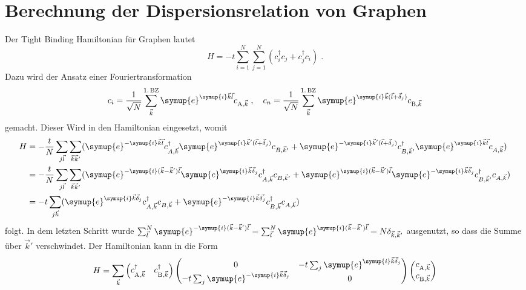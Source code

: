 \section{Berechnung der Dispersionsrelation von Graphen}
\label{sec:calc_dispersion}
Der Tight Binding Hamiltonian für Graphen lautet
\begin{equation*}
   H= - t \sum_{i=1}^N \sum_{j=1}^N\left ( c_i^\dagger c_j + c_j^\dagger c_i \right ) \; .
\end{equation*}
Dazu wird der Ansatz einer Fouriertransformation 
\begin{equation*}
    c_i = \frac{1}{\sqrt{N}} \sum_{\vec{k}}^{1. \, \text{BZ}} \symup{e}^{\symup{i}\vec{k}\vec{l}} c_{\text{A}, \vec{k}} \; , 
    \quad c_n = \frac{1}{\sqrt{N}} \sum_{\vec{k}}^{1. \, \text{BZ}} \symup{e}^{\symup{i}\vec{k}(\vec{l}+\vec{\delta}_j)} c_{\text{B}, \vec{k}}
\end{equation*}
gemacht. 
Dieser Wird in den Hamiltonian eingesetzt, womit 
\begin{align*}
    H &= -\frac{t}{N} \sum_{j\vec{l}} \sum_{\vec{k}\vec{k}'} ( \symup{e}^{-\symup{i}\vec{k}\vec{l}}c^\dagger_{A,\vec{k}} 
    \symup{e}^{\symup{i}\vec{k}'(\vec{l}+\vec{\delta}_j)}c_{B,\vec{k}'} + \symup{e}^{-\symup{i}\vec{k}'(\vec{l}+\vec{\delta}_j)} c^\dagger_{B,\vec{k}'} 
    \symup{e}^{\symup{i}\vec{k}\vec{l}}c_{A,\vec{k}}) \\
    &= -\frac{t}{N} \sum_{j\vec{l}} \sum_{\vec{k}\vec{k}'} ( \symup{e}^{-\symup{i}(\vec{k}- \vec{k}')\vec{l}}\symup{e}^{\symup{i}\vec{k}\vec{\delta}_j}c^\dagger_{A,\vec{k}} c_{B,\vec{k}'} + 
    \symup{e}^{\symup{i}(\vec{k}- \vec{k}')\vec{l}} \symup{e}^{-\symup{i}\vec{k}\vec{\delta}_j} c^\dagger_{B,\vec{k}'}c_{A,\vec{k}}) \\
    &= -t \sum_{j\vec{k}} ( \symup{e}^{\symup{i}\vec{k}\vec{\delta}_j}c^\dagger_{A,\vec{k}} c_{B,\vec{k}} + 
    \symup{e}^{-\symup{i}\vec{k}\vec{\delta_j}} c^\dagger_{B,\vec{k}}c_{A,\vec{k}})
\end{align*}
folgt.
In dem letzten Schritt wurde $\sum_{\vec{l}}^N \symup{e}^{-\symup{i}(\vec{k}- \vec{k}')\vec{l}} 
= \sum_{\vec{l}}^N \symup{e}^{\symup{i}(\vec{k}- \vec{k}')\vec{l}} = N\delta_{\vec{k}, \vec{k}'}$ ausgenutzt, so dass die Summe über $\vec{k}'$ verschwindet.
Der Hamiltonian kann in die Form 
\begin{equation*}
    H = \sum_{\vec{k}} \begin{pmatrix}
        c_{\text{A},\vec{k}}^{\dagger} & c_{\text{B},\vec{k}}^{\dagger}
    \end{pmatrix}
    \begin{pmatrix}
        0 & -t\sum_{j} \symup{e}^{\symup{i}\vec{k}\vec{\delta}_j}     \\
        -t\sum_{j} \symup{e}^{-\symup{i}\vec{k}\vec{\delta}_j} & 0     
    \end{pmatrix}
    \begin{pmatrix}
        c_{\text{A},\vec{k}} \\
        c_{\text{B},\vec{k}}
    \end{pmatrix}
\end{equation*}
